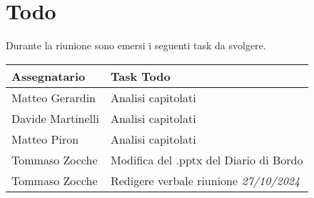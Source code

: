 \section{Todo}
Durante la riunione sono emersi i seguenti task da svolgere.

\begin{center}
  \begin{tabular}{|p{5cm}|p{8cm}|}
    \hline
    \textbf{Assegnatario}       & \textbf{Task Todo}                             \\ \hline
    Matteo Gerardin   & Analisi capitolati \\ \hline
    Davide Martinelli   & Analisi capitolati \\ \hline
    Matteo Piron   & Analisi capitolati \\ \hline
    Tommaso Zocche & Modifica del .pptx del Diario di Bordo \\ \hline
    Tommaso Zocche   & Redigere verbale riunione \textit{27/10/2024}  \\ \hline
  \end{tabular}
\end{center}
